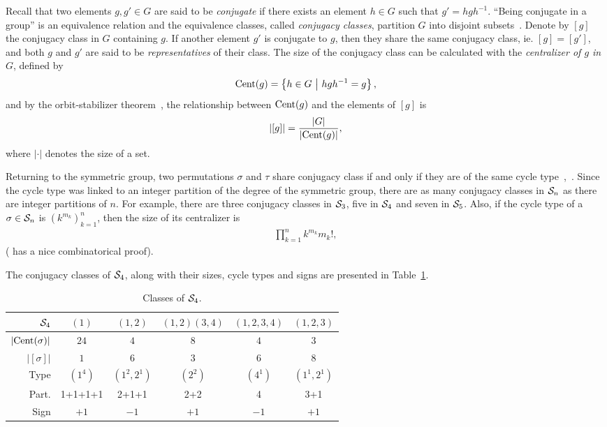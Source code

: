 Recall that two elements $g, g' \in G$ are said to be \textit{conjugate} if there exists an element $h \in G$ such that $g' = hgh^{-1}$. ``Being conjugate in a group'' is an equivalence relation and the equivalence classes, called \textit{conjugacy classes}, partition $G$ into disjoint subsets~\cite[Sect.1.1.]{Sagan}. Denote by $[g]$ the conjugacy class in $G$ containing $g$. If another element $g'$ is conjugate to $g$, then they share the same conjugacy class, ie. $[g] = [g']$, and both $g$ and $g'$ are said to be \textit{representatives} of their class. The size of the conjugacy class can be calculated with the \textit{centralizer of $g$ in $G$}, defined by
\begin{align*}
	\text{Cent}(g) = \left\lbrace h \in G \ \middle\vert \ hgh^{-1} = g \right\rbrace,
\end{align*}
and by the orbit-stabilizer theorem~\cite[Thm.21.3]{Biggs}, the relationship between $\text{Cent}(g)$ and the elements of $[g]$ is 
\begin{align*}
	|[g]| = \frac{|G|}{|\text{Cent}(g)|},
\end{align*}
where $| \cdot |$ denotes the size of a set.

Returning to the symmetric group, two permutations $\sigma$ and $\tau$ share conjugacy class if and only if they are of the same cycle type~\cite[Sect.1.1.]{Sagan},~\cite[Thm.12.5.]{Biggs}. Since the cycle type was linked to an integer partition of the degree of the symmetric group, there are as many conjugacy classes in $\mathcal{S}_n$ as there are integer partitions of $n$. For example, there are three conjugacy classes in $\mathcal{S}_3$, five in $\Sym_4$ and seven in $\mathcal{S}_5$. Also, if the cycle type of a $\sigma \in \mathcal{S}_n$ is $(k^{m_k})_{k=1}^n$, then the size of its centralizer is 
\begin{align*}
	\prod_{k=1}^{n} k^{m_k} m_k!,
\end{align*}
(\cite[Prop.1.1.1.]{Sagan} has a nice combinatorical proof).

\begin{example}[$\Sym_4$]
	The conjugacy classes of $\Sym_4$, along with their sizes, cycle types and signs are presented in Table~\ref{table:elementsSym4}.
	\begin{table}[hbt!]
		\centering
		\begin{tabular}{r | c c c c c}
			         $\Sym_4$ & $(1)$   & $(1,2)$     & $(1,2)(3,4)$ & $(1,2,3,4)$ & $(1,2,3)$   \\ \hline
			$|\text{Cent}(\sigma)|$ & $24$    & $4$         & $8$          & $4$         & $3$         \\
			     $|[\sigma]|$ & $1$     & $6$         & $3$          & $6$         & $8$         \\
			             Type & $(1^4)$ & $(1^2,2^1)$ & $(2^2)$      & $(4^1)$     & $(1^1,2^1)$ \\
			            Part. & 1+1+1+1 & 2+1+1       & 2+2          & 4           & 3+1         \\
			             Sign & $+1$    & $-1$        & $+1$         & $-1$& $+1$        
		\end{tabular}
		\caption{Classes of $\Sym_4$.}
		\label{table:elementsSym4}
	\end{table}
\end{example}



